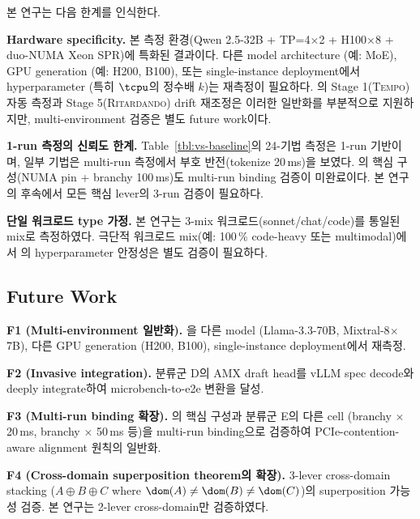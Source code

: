 본 연구는 다음 한계를 인식한다.

\textbf{Hardware specificity.}
본 측정 환경(Qwen 2.5-32B + TP=4$\times$2 + H100$\times$8 + duo-NUMA Xeon SPR)에 특화된 결과이다.
다른 model architecture (예: MoE), GPU generation (예: H200, B100), 또는 single-instance deployment에서 hyperparameter (특히 $\tcpu$의 정수배 $k$)는 재측정이 필요하다.
\algname 의 Stage 1(\textsc{Tempo}) 자동 측정과 Stage 5(\textsc{Ritardando}) drift 재조정은 이러한 일반화를 부분적으로 지원하지만, multi-environment 검증은 별도 future work이다.

\textbf{1-run 측정의 신뢰도 한계.}
Table~\ref{tbl:vs-baseline}의 24-기법 측정은 1-run 기반이며, 일부 기법은 multi-run 측정에서 부호 반전(tokenize 20\,ms)을 보였다.
\algname 의 핵심 구성(NUMA pin + branchy 100\,ms)도 multi-run binding 검증이 미완료이다.
본 연구의 후속에서 모든 핵심 lever의 3-run 검증이 필요하다.

\textbf{단일 워크로드 type 가정.}
본 연구는 3-mix 워크로드(sonnet/chat/code)를 통일된 mix로 측정하였다.
극단적 워크로드 mix(예: 100\,\% code-heavy 또는 multimodal)에서 \algname 의 hyperparameter 안정성은 별도 검증이 필요하다.

\subsection{Future Work}

\textbf{F1 (Multi-environment 일반화).}
\algname 을 다른 model (Llama-3.3-70B, Mixtral-8$\times$7B), 다른 GPU generation (H200, B100), single-instance deployment에서 재측정.

\textbf{F2 (Invasive integration).}
분류군 D의 AMX draft head를 vLLM spec decode와 deeply integrate하여 microbench-to-e2e 변환을 달성.

\textbf{F3 (Multi-run binding 확장).}
\algname 의 핵심 구성과 분류군 E의 다른 cell (branchy $\times$ 20\,ms, branchy $\times$ 50\,ms 등)을 multi-run binding으로 검증하여 PCIe-contention-aware alignment 원칙의 일반화.

\textbf{F4 (Cross-domain superposition theorem의 확장).}
3-lever cross-domain stacking ($A \oplus B \oplus C$ where $\dom(A) \neq \dom(B) \neq \dom(C)$)의 superposition 가능성 검증.
본 연구는 2-lever cross-domain만 검증하였다.
